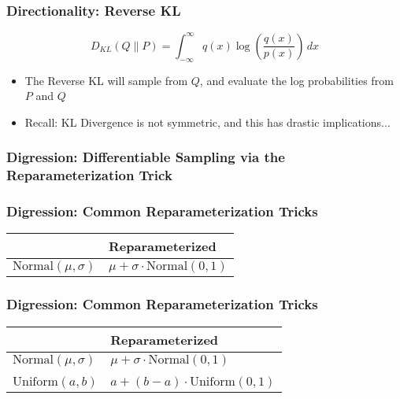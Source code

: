 \documentclass{beamer}
\begin{document}
\begin{frame}
  \frametitle{Directionality: Reverse KL}
  \begin{equation*}
    D_{KL} (Q \parallel P) = \int_{-\infty}^{\infty} q(x)\log \left({\frac {q(x)}{p(x)}}\right)\,dx
  \end{equation*}
  \begin{itemize}
    \item The Reverse KL will sample from $Q$, and evaluate the log probabilities from $P$ and $Q$
    \item Recall: KL Divergence is not symmetric, and this has drastic implications...
  \end{itemize}
\end{frame}


\begin{frame}
  \frametitle{Digression: Differentiable Sampling via the Reparameterization Trick}

\end{frame}


\begin{frame}
  \frametitle{Digression: Common Reparameterization Tricks}
  \begin{center}
  \begin{tabular}{C{4cm}C{4cm}}
  \toprule
  {} & Reparameterized \\
  \midrule
  $\text{Normal}(\mu, \sigma)$   &  $\mu + \sigma \cdot \text{Normal}(0, 1)$ \\
  \bottomrule
  \end{tabular}
  \end{center}
\end{frame}

\begin{frame}
  \frametitle{Digression: Common Reparameterization Tricks}
  \begin{center}
  \begin{tabular}{C{4cm}C{4cm}}
  \toprule
  {} & Reparameterized \\
  \midrule
  $\text{Normal}(\mu, \sigma)$   &  $\mu + \sigma \cdot \text{Normal}(0, 1)$ \\
  \\
  $\text{Uniform}(a, b)$   &  $a + (b - a) \cdot \text{Uniform}(0, 1)$ \\
  \bottomrule
  \end{tabular}
  \end{center}
\end{frame}
\end{document}

